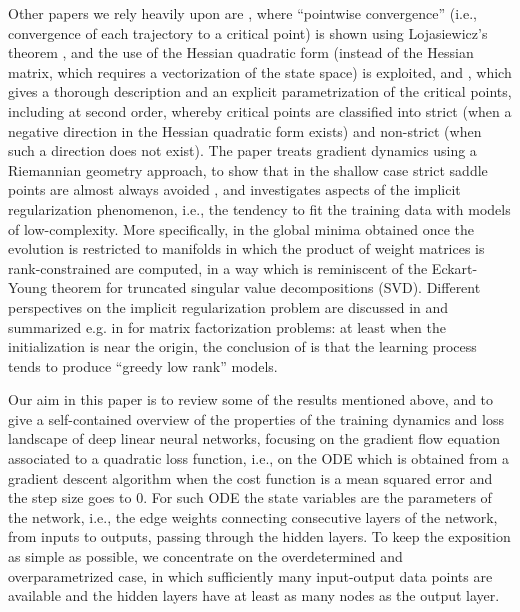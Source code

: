 \documentclass{article}
\newcommand{\1}{\mathds{1}}
\begin{document}
Other papers we rely heavily upon are \cite{chitour2018geometric}, where ``pointwise convergence'' (i.e., convergence of each trajectory to a critical point) is shown using Lojasiewicz's theorem \cite{lojasiewicz1982trajectoires}, and the use of the Hessian quadratic form (instead of the Hessian matrix, which requires a vectorization of the state space) is exploited, and \cite{achour2021loss}, which gives a thorough description and an explicit parametrization of the critical points, including at second order, whereby critical points are classified into strict (when a negative direction in the Hessian quadratic form exists) and non-strict (when such a direction does not exist). 
The paper \cite{bah2022learning} treats gradient dynamics using a Riemannian geometry approach, to show that in the shallow case strict saddle points are almost always avoided \cite{chitour2018geometric,lee2019first}, and investigates aspects of the implicit regularization phenomenon, i.e., the tendency to fit the training data with models of low-complexity.
More specifically, in \cite{bah2022learning,achour2021loss} the global minima obtained once the evolution is restricted to manifolds in which the product of weight matrices is rank-constrained are computed, in a way which is reminiscent of the Eckart-Young theorem for truncated singular value decompositions (SVD). 
Different perspectives on the implicit regularization problem are discussed in \cite{gunasekar2017implicit,du2018algorithmic,li2020towards,arora2019implicit,belabbas2020implicit} and summarized e.g. in \cite{cohen2024lecture,li2020towards} for matrix factorization problems: at least when the initialization is near the origin, the conclusion of \cite{cohen2024lecture,li2020towards} is that the learning process tends to produce ``greedy low rank'' models. 


Our aim in this paper is to review some of the results mentioned above, and to give a self-contained overview of the properties of the training dynamics and loss landscape of deep linear neural networks, focusing on the gradient flow equation associated to a quadratic loss function, i.e., on the ODE which is obtained from a gradient descent algorithm when the cost function is a mean squared error and the step size goes to $0$. 
For such ODE the state variables are the parameters of the network, i.e., the edge weights connecting consecutive layers of the network, from inputs to outputs, passing through the hidden layers.
To keep the exposition as simple as possible, we concentrate on the overdetermined and overparametrized case, in which sufficiently many input-output data points are available and the hidden layers have at least as many nodes as the output layer.
\end{document}
